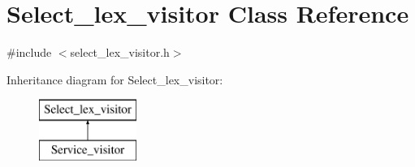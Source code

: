 \hypertarget{classSelect__lex__visitor}{}\section{Select\+\_\+lex\+\_\+visitor Class Reference}
\label{classSelect__lex__visitor}


{\ttfamily \#include $<$select\+\_\+lex\+\_\+visitor.\+h$>$}

Inheritance diagram for Select\+\_\+lex\+\_\+visitor\+:\begin{figure}[H]
\begin{center}
\leavevmode
\includegraphics[height=2.000000cm]{classSelect__lex__visitor}
\end{center}
\end{figure}
